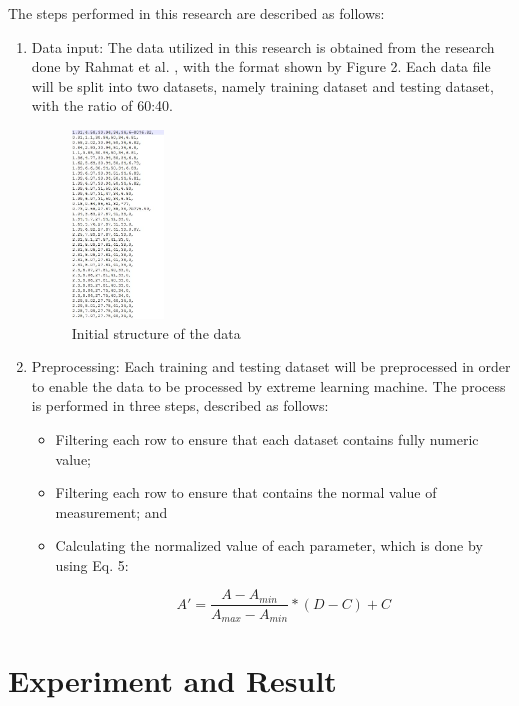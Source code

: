 \documentclass[journal,comsoc]{IEEEtran}
\let\MYoriglatexcaption\caption
\renewcommand{\caption}[2][\relax]{\MYoriglatexcaption[#2]{#2}}
\begin{document}
The steps performed in this research are described as follows:

\begin{enumerate}
	\item Data input: The data utilized in this research is obtained from the research done by Rahmat et al. \cite{Rahmat16}, with the format shown by Figure 2. Each data file will be split into two datasets, namely training dataset and testing dataset, with the ratio of 60:40.
	
	\begin{figure}[th]
		\centering
		\includegraphics[width=0.8\columnwidth, height=5cm]{initial-structure.jpg}
		\caption{Initial structure of the data}
	\end{figure}
	
	\item Preprocessing: Each training and testing dataset will be preprocessed in order to enable the data to be processed by extreme learning machine. The process is performed in three steps, described as follows:
	
	\begin{itemize}
		\item Filtering each row to ensure that each dataset contains fully numeric value;
		\item Filtering each row to ensure that contains the normal value of measurement; and
		\item Calculating the normalized value of each parameter, which is done by using Eq. 5:
		
		\begin{equation}
		A' = \frac{A - A_{min}}{A_{max} - A_{min}} * (D - C) + C\label{Eq. 5}
		\end{equation}
	\end{itemize}

    
\end{enumerate}

\section{Experiment and Result}
\end{document}
